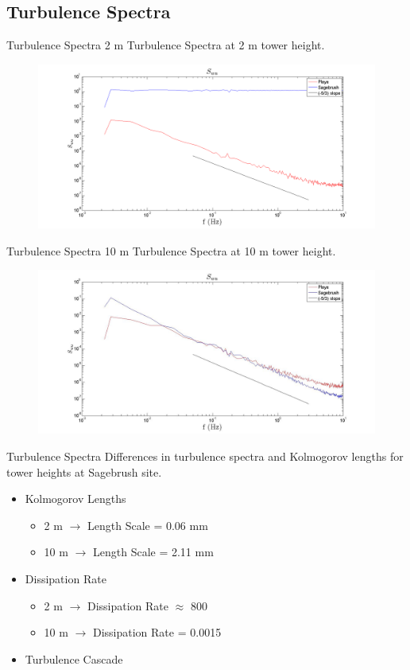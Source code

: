 \documentclass{beamer}
\begin{document}
\subsection{Turbulence Spectra}
\begin{frame}{Turbulence Spectra 2 m}
Turbulence Spectra at 2 m tower height.
\begin{figure}
\centering
\includegraphics[width=\linewidth]{plots/S_uu.png}
\end{figure}
\end{frame}

\begin{frame}{Turbulence Spectra 10 m}
Turbulence Spectra at 10 m tower height.
\begin{figure}
\centering
\includegraphics[width=\linewidth]{plots/S_uu10m.jpg}
\end{figure}
\end{frame}

\begin{frame}{Turbulence Spectra}
Differences in turbulence spectra and Kolmogorov lengths for tower heights at Sagebrush site.
\begin{itemize}
\item{Kolmogorov Lengths}
	\begin{itemize}
	\item{2 m $\rightarrow$ Length Scale = 0.06 mm}
	\item{10 m $\rightarrow$ Length Scale = 2.11 mm}
	\end{itemize}
\item{Dissipation Rate}
	\begin{itemize}
	\item{2 m $\rightarrow$ Dissipation Rate $\approx$ 800}
	\item{10 m $\rightarrow$ Dissipation Rate = 0.0015}
	\end{itemize}
\item{Turbulence Cascade} 
\end{itemize}%
\end{frame}
\end{document}

